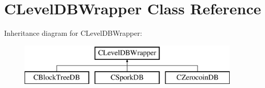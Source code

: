 \hypertarget{class_c_level_d_b_wrapper}{}\section{C\+Level\+D\+B\+Wrapper Class Reference}
\label{class_c_level_d_b_wrapper}
Inheritance diagram for C\+Level\+D\+B\+Wrapper\+:\begin{figure}[H]
\begin{center}
\leavevmode
\includegraphics[height=2.000000cm]{class_c_level_d_b_wrapper}
\end{center}
\end{figure}
